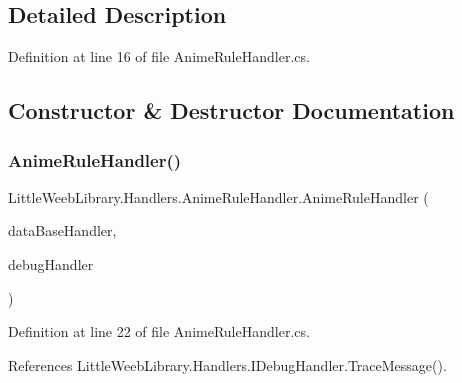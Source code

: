 \subsection{Detailed Description}


Definition at line 16 of file Anime\+Rule\+Handler.\+cs.



\subsection{Constructor \& Destructor Documentation}
\mbox{\label{class_little_weeb_library_1_1_handlers_1_1_anime_rule_handler_a71cb7aa9d7e5df35ae28ac4fcb11a51f}} 
\subsubsection{\texorpdfstring{Anime\+Rule\+Handler()}{AnimeRuleHandler()}}
{\footnotesize\ttfamily Little\+Weeb\+Library.\+Handlers.\+Anime\+Rule\+Handler.\+Anime\+Rule\+Handler (\begin{DoxyParamCaption}\item[{\mbox{\hyperlink{interface_little_weeb_library_1_1_handlers_1_1_i_data_base_handler}{I\+Data\+Base\+Handler}}}]{data\+Base\+Handler,  }\item[{\mbox{\hyperlink{interface_little_weeb_library_1_1_handlers_1_1_i_debug_handler}{I\+Debug\+Handler}}}]{debug\+Handler }\end{DoxyParamCaption})}



Definition at line 22 of file Anime\+Rule\+Handler.\+cs.



References Little\+Weeb\+Library.\+Handlers.\+I\+Debug\+Handler.\+Trace\+Message().



